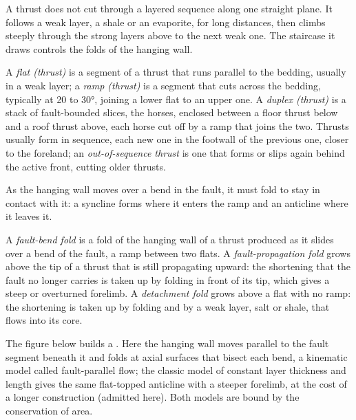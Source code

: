 A thrust does not cut through a layered sequence along one straight plane.
It follows a weak layer, a shale or an evaporite, for long distances, then
climbs steeply through the strong layers above to the next weak one. The
staircase it draws controls the folds of the hanging wall.

\begin{definition}\label{def:b3:orogenic-wedges:thrust-geometry}
A \emph{flat (thrust)} is a segment of a thrust that runs
parallel to the bedding, usually in a weak layer; a \emph{ramp
(thrust)} is a segment that cuts across the bedding,
typically at 20 to \ang{30}, joining a lower flat to an upper one. A
\emph{duplex (thrust)} is a stack of fault-bounded
slices, the horses, enclosed between a floor thrust below and a roof thrust
above, each horse cut off by a ramp that joins the two. Thrusts usually form
in sequence, each new one in the footwall of the previous one, closer to the
foreland; an \emph{out-of-sequence thrust} is
one that forms or slips again behind the active front, cutting older thrusts.
\end{definition}

As the hanging wall moves over a bend in the fault, it must fold to stay in
contact with it: a syncline forms where it enters the ramp and an anticline
where it leaves it.

\begin{definition}\label{def:b3:orogenic-wedges:thrust-folds}
A \emph{fault-bend fold} is a fold of the hanging wall
of a thrust produced as it slides over a bend of the fault, a ramp between
two flats. A \emph{fault-propagation fold}
grows above the tip of a thrust that is still propagating upward: the
shortening that the fault no longer carries is taken up by folding in front
of its tip, which gives a steep or overturned forelimb. A \emph{detachment
fold} grows above a flat with no ramp: the shortening
is taken up by folding and by a weak layer, salt or shale, that flows into
its core.
\end{definition}

The figure below builds a . Here the hanging wall moves
parallel to the fault segment beneath it and folds at axial surfaces that
bisect each bend, a kinematic model called fault-parallel flow; the classic
model of constant layer thickness and length gives the same flat-topped
anticline with a steeper forelimb, at the cost of a longer construction
(admitted here). Both models are bound by the conservation of area.

